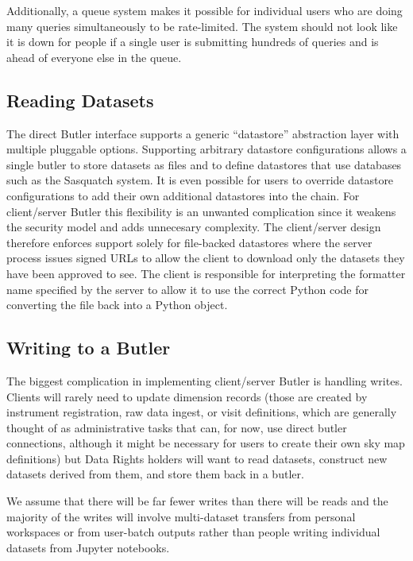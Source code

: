 Additionally, a queue system makes it possible for individual users who are doing many queries simultaneously to be rate-limited.
The system should not look like it is down for people if a single user is submitting hundreds of queries and is ahead of everyone else in the queue.

\subsection{Reading Datasets}

The direct Butler interface supports a generic ``datastore'' abstraction layer with multiple pluggable options.
Supporting arbitrary datastore configurations allows a single butler to store datasets as files and to define datastores that use databases such as the Sasquatch system.\cite{2024SPIE13101.59Ftmp}
It is even possible for users to override datastore configurations to add their own additional datastores into the chain.
For client/server Butler this flexibility is an unwanted complication since it weakens the security model and adds unnecesary complexity.
The client/server design therefore enforces support solely for file-backed datastores where the server process issues signed URLs to allow the client to download only the datasets they have been approved to see.
The client is responsible for interpreting the formatter name specified by the server to allow it to use the correct Python code for converting the file back into a Python object.

\subsection{Writing to a Butler}

The biggest complication in implementing client/server Butler is handling writes.
Clients will rarely need to update dimension records (those are created by instrument registration, raw data ingest, or visit definitions, which are generally thought of as administrative tasks that can, for now, use direct butler connections, although it might be necessary for users to create their own sky map definitions) but Data Rights holders will want to read datasets, construct new datasets derived from them, and store them back in a butler.

We assume that there will be far fewer writes than there will be reads and the majority of the writes will involve multi-dataset transfers from personal workspaces or from user-batch outputs \cite{DMTN-223} rather than people writing individual datasets from Jupyter notebooks.

